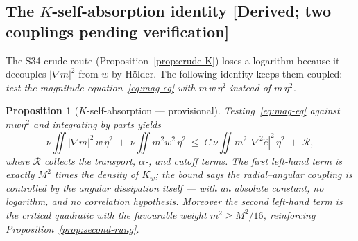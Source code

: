 \documentclass[11pt]{article}
\newtheorem{proposition}[theorem]{Proposition}
\theoremstyle{definition}
\theoremstyle{remark}
\begin{document}
\subsection{The $K$-self-absorption identity [Derived; two couplings pending
verification]}

The S34 crude route (Proposition~\ref{prop:crude-K}) loses a logarithm
because it decouples $|\nabla m|^2$ from $w$ by H\"older. The following
identity keeps them coupled: \emph{test the magnitude
equation~\eqref{eq:mag-eq} with $m\,w\,\eta^2$ instead of $m\,\eta^2$.}

\begin{proposition}[$K$-self-absorption --- provisional]\label{prop:K-self}
  Testing~\eqref{eq:mag-eq} against $m w\eta^2$ and integrating by parts
  yields
  \begin{equation}\label{eq:K-self-identity}
    \nu\iint |\nabla m|^2\,w\,\eta^2
    \;+\; \nu\iint m^2 w^2\,\eta^2
    \;\leq\;
    C\,\nu\iint m^2\,|\nabla^2\hat{e}|^2\,\eta^2
    \;+\; \mathcal{R},
  \end{equation}
  where $\mathcal{R}$ collects the transport, $\alpha$-, and cutoff terms.
  The first left-hand term is exactly $M^2$ times the density of
  $K_w$; the bound says \emph{the radial--angular coupling is controlled by
  the angular dissipation itself} --- with an absolute constant, no
  logarithm, and no correlation hypothesis. Moreover the second left-hand
  term is the critical quadratic with the favourable weight $m^2\geq M^2/16$,
  reinforcing Proposition~\ref{prop:second-rung}.
\end{proposition}
\end{document}

